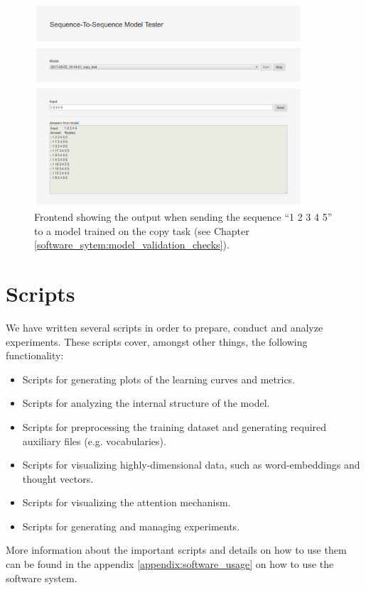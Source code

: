 \begin{figure}[H]
	\centering
	\includegraphics[width=10cm]{img/web_frontend_inference}
	\caption{Frontend showing the output when sending the sequence ``1 2 3 4 5'' to a model trained on the copy task (see Chapter \ref{software_sytem:model_validation_checks}).}
\end{figure}

\section{Scripts}
We have written several scripts in order to prepare, conduct and analyze experiments. These scripts cover, amongst other things, the following functionality:

\begin{itemize}[noitemsep]
	\item Scripts for generating plots of the learning curves and metrics.
	\item Scripts for analyzing the internal structure of the model.
	\item Scripts for preprocessing the training dataset and generating required auxiliary files (e.g. vocabularies).
	\item Scripts for visualizing highly-dimensional data, such as word-embeddings and thought vectors.
	\item Scripts for visualizing the attention mechanism.
	\item Scripts for generating and managing experiments.
\end{itemize}

More information about the important scripts and details on how to use them can be found in the appendix \ref{appendix:software_usage} on how to use the software system.

